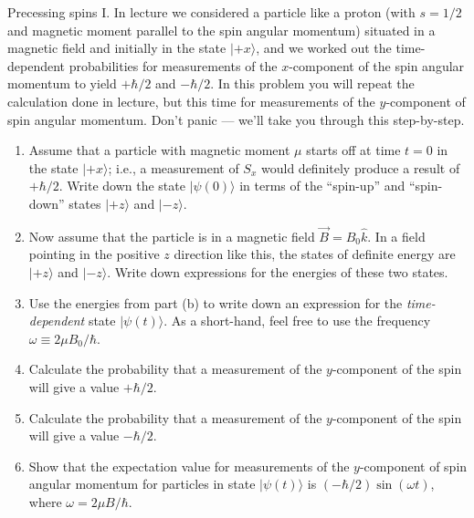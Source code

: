 \begin{aproblem}{Precessing spins I.}  
  In lecture we considered a particle like a proton (with $s=1/2$ and
  magnetic moment parallel to the spin angular momentum) situated in a
  magnetic field and initially in the state $|\mbox{$+x$}\rangle$, and
  we worked out the time-dependent probabilities for measurements of
  the $x$-component of the spin angular momentum to yield $+\hbar/2$
  and $-\hbar/2$.  In this problem you will repeat the calculation
  done in lecture, but this time for measurements of the $y$-component
  of spin angular momentum.  Don't panic --- we'll take you through
  this step-by-step.
  \label{prob:qm_precess_1}

  \begin{enumerate}

  \item Assume that a particle with magnetic moment $\mu$ starts off
    at time $t=0$ in the state $|\mbox{$+x$}\rangle$; i.e., a
    measurement of $S_x$ would definitely produce a result of $+\hbar
    /2$.  Write down the state $|\psi(0)\rangle$ in terms of the
    ``spin-up'' and ``spin-down'' states $|\mbox{$+z$}\rangle$ and
    $|\mbox{$-z$}\rangle$.

  \item Now assume that the particle is in a magnetic field
    $\vec{B}=B_0 \widehat{k}$.  In a field pointing in the positive
    $z$ direction like this, the states of definite energy are
    $|\mbox{$+z$}\rangle$ and $|\mbox{$-z$}\rangle$.  Write down
    expressions for the energies of these two states.

  \item Use the energies from part (b) to write down an expression for
    the {\em time-dependent} state $|\psi(t)\rangle$.  As a
    short-hand, feel free to use the frequency $\omega \equiv 2\mu
    B_0/\hbar$.

  \item Calculate the probability that a measurement of the
    $y$-component of the spin will give a value $+\hbar/2$.

  \item Calculate the probability that a measurement of the
    $y$-component of the spin will give a value $-\hbar/2$.

  \item Show that the expectation value for measurements of the
    $y$-com\-ponent of spin angular momentum for particles in state
    $|\psi(t)\rangle$ is $(-\hbar/2)\sin(\omega t)$, where $\omega =
    2\mu B/\hbar$.

  \end{enumerate}
\end{aproblem}


